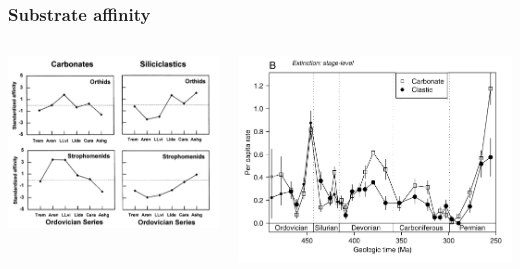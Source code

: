 \documentclass{beamer}
\begin{document}
\begin{frame}
  \frametitle{Substrate affinity}

  \begin{columns}
    \begin{column}{0.5\textwidth}
      \begin{center}
        \includegraphics[width = \textwidth, keepaspectratio = true]{figure/miller}

        \tiny{}

      \end{center}
    \end{column}
    \begin{column}{0.5\textwidth}
      \begin{center}
        \includegraphics[width = \textwidth, keepaspectratio = true]{figure/foote}

        \tiny{}
      \end{center}
    \end{column}
  \end{columns}
\end{frame}
\end{document}
